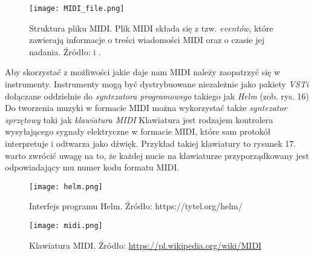 \begin{figure}[H]\texttt{[image: MIDI\_file.png]}
\begin{center}
\caption{Struktura pliku MIDI. Plik MIDI składa się z tzw. \textit{eventów}, które zawierają informacje o treści wiadomości MIDI oraz o czasie jej nadania. Źródło: \citep[s. 2 - 3]{MIDI_Format} i \citep{Tse2008}.}
\centering
\end{center}
\end{figure}

Aby skorzystać z możliwości jakie daje nam MIDI należy zaopatrzyć się w instrumenty. Instrumenty mogą być dystrybuowane niezależnie jako pakiety \textit{VSTi} dołączane oddzielnie do \textit{syntezatora programowego} takiego jak \textit{Helm} (zob. rys. 16)
Do tworzenia muzyki w formacie MIDI można wykorzystać także \textit{syntezator sprzętowy} taki jak \textit{klawiatura MIDI} Klawiatura jest rodzajem kontrolera wysyłającego sygnały elektryczne w formacie MIDI, które sam protokół interpretuje i odtwarza jako dźwięk. Przykład takiej klawiatury to rysunek 17. warto zwrócić uwagę na to, że każdej nucie na klawiaturze przyporządkowany jest odpowiadający mu numer kodu formatu MIDI.

\begin{figure}[H]
\begin{center}
\texttt{[image: helm.png]}
\centering
\caption{Interfejs programu Helm. Źródło: https://tytel.org/helm/}
\centering
\end{center}
\end{figure}


\begin{figure}[H]
\begin{center}
\texttt{[image: midi.png]}
\centering
\caption{Klawiatura MIDI, Źródło: \href{https://pl.wikipedia.org/wiki/MIDI}{https://pl.wikipedia.org/wiki/MIDI}}
\centering
\end{center}
\end{figure}
 
